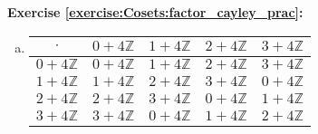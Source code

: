 \noindent\textbf{Exercise \ref{exercise:Cosets:factor_cayley_prac}:}
\begin{enumerate}[(a)]
\item
\begin{center}
\begin{tabular}{c|cccc}
$\cdot$             & $0 + 4{\mathbb Z}$ & $1 + 4{\mathbb Z}$ & $2 + 4{\mathbb Z}$ & $3 + 4{\mathbb Z}$ \\\hline
$0 + 4{\mathbb Z}$ & $0 + 4{\mathbb Z}$ & $1 + 4{\mathbb Z}$ & $2 + 4{\mathbb Z}$ & $3 + 4{\mathbb Z}$\\
$1 + 4{\mathbb Z}$ & $1 + 4{\mathbb Z}$ & $2 + 4{\mathbb Z}$ & $3 + 4{\mathbb Z}$ & $0 + 4{\mathbb Z}$\\
$2 + 4{\mathbb Z}$ & $2 + 4{\mathbb Z}$ & $3 + 4{\mathbb Z}$ & $0 + 4{\mathbb Z}$ & $1 + 4{\mathbb Z}$\\
$3 + 4{\mathbb Z}$ & $3 + 4{\mathbb Z}$ & $0 + 4{\mathbb Z}$ & $1 + 4{\mathbb Z}$ & $2 + 4{\mathbb Z}$\\
\end{tabular}
\end{center}

 

\end{enumerate}

